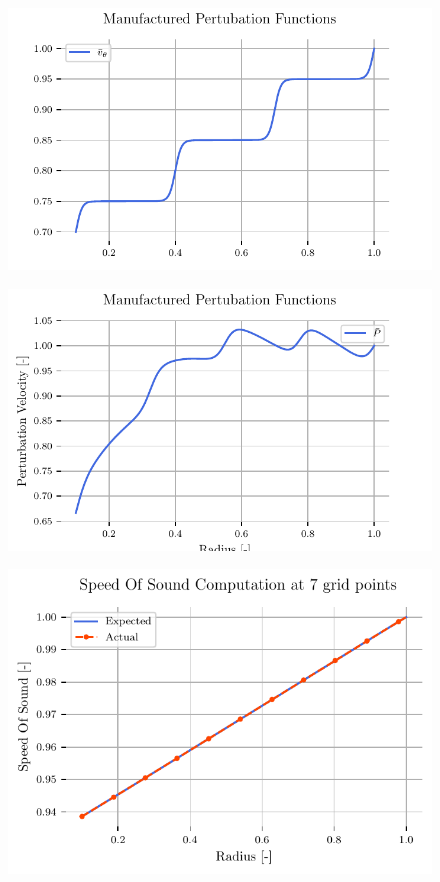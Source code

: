 \documentclass{article}
\begin{document}
\begin{figure}
    \centering
    \includegraphics[width=\textwidth]{tex-outputs/MMS_perturbation_variables_vTh.pdf}
\end{figure}

\begin{figure}
    \centering
    \includegraphics[width=\textwidth]{tex-outputs/MMS_perturbation_variables_Pr.pdf}
\end{figure}

\begin{figure}
    \centering
    \includegraphics[width=\textwidth]{tex-outputs/SpeedOfSoundComparison1.pdf}
\end{figure}
\end{document}
